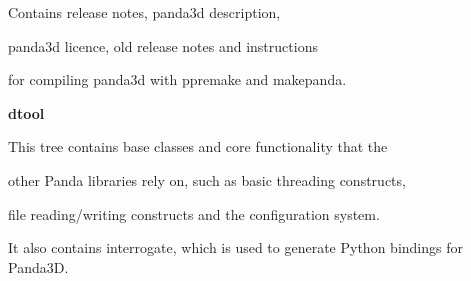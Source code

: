 \documentclass[a4paper]{article}
\begin{document}
{\centering\color{black}
Contains release notes, panda3d description,
\par}

{\centering\color{black}
panda3d licence, old release notes and instructions
\par}

{\centering\color{black}
for compiling panda3d with ppremake and makepanda.
\par}

\clearpage
\bigskip


\bigskip

{\centering\sffamily\bfseries
\hypertarget{RefHeading19771167907073}{}dtool
\par}

{\centering
This tree contains base classes and core functionality that the
\par}

{\centering
other Panda libraries rely on, such as basic threading constructs, 
\par}

{\centering
file reading/writing constructs and the configuration system. 
\par}

{\centering
It also contains interrogate, which is used to generate Python bindings for Panda3D.
\par}
\end{document}
